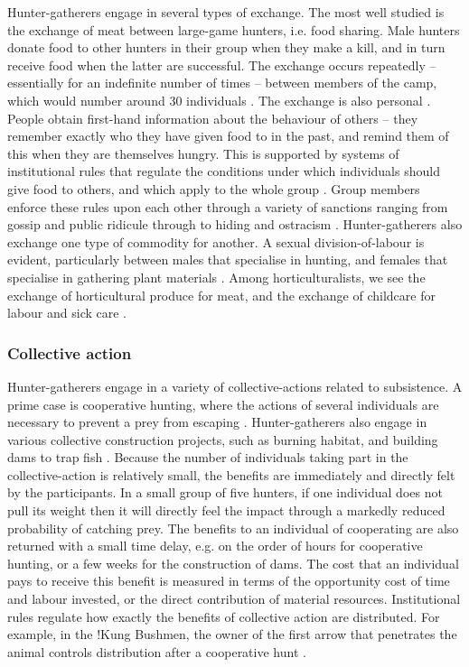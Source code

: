 \documentclass[10pt, a4paper, fleqn]{article}
\begin{document}
Hunter-gatherers engage in several types of exchange. The most well studied is the exchange of meat between large-game hunters, i.e. food sharing. Male hunters donate food to other hunters in their group when they make a kill, and in turn receive food when the latter are successful. The exchange occurs repeatedly -- essentially for an indefinite number of times -- between members of the camp, which would number around 30 individuals \citep{Marlowe:2005:a,Kelly:2013:a}. The exchange is also personal \citep{North:1990:a,Greif:2006:a}. People obtain first-hand information about the behaviour of others -- they remember exactly who they have given food to in the past, and remind them of this when they are themselves hungry. This is supported by systems of institutional rules that regulate the conditions under which individuals should give food to others, and which apply to the whole group \citep{Kaplan:2009:a}. Group members enforce these rules upon each other through a variety of sanctions ranging from gossip and public ridicule through to hiding and ostracism \citep{Boehm:1999:a}. Hunter-gatherers also exchange one type of commodity for another. A sexual division-of-labour is evident, particularly between males that specialise in hunting, and females that specialise in gathering plant materials \citep{Marlowe:2007:a}. Among horticulturalists, we see the exchange of horticultural produce for meat, and the exchange of childcare for labour and sick care \citep{Jaeggi:2016:a}.

\subsubsection*{Collective action}

Hunter-gatherers engage in a variety of collective-actions related to subsistence. A prime case is cooperative hunting, where the actions of several individuals are necessary to prevent a prey from escaping \citep{Kaplan:2009:a,Alvard:2002:a}. Hunter-gatherers also engage in various collective construction projects, such as burning habitat, and building dams to trap fish \citep{Kaplan:2009:a}. Because the number of individuals taking part in the collective-action is relatively small, the benefits are immediately and directly felt by the participants. In a small group of five hunters, if one individual does not pull its weight then it will directly feel the impact through a markedly reduced probability of catching prey. The benefits to an individual of cooperating are also returned with a small time delay, e.g. on the order of hours for cooperative hunting, or a few weeks for the construction of dams. The cost that an individual pays to receive this benefit is measured in terms of the opportunity cost of time and labour invested, or the direct contribution of material resources. Institutional rules regulate how exactly the benefits of collective action are distributed. For example, in the !Kung Bushmen, the owner of the first arrow that penetrates the animal controls distribution after a cooperative hunt \citep{Testart:1987:a}.
\end{document}

